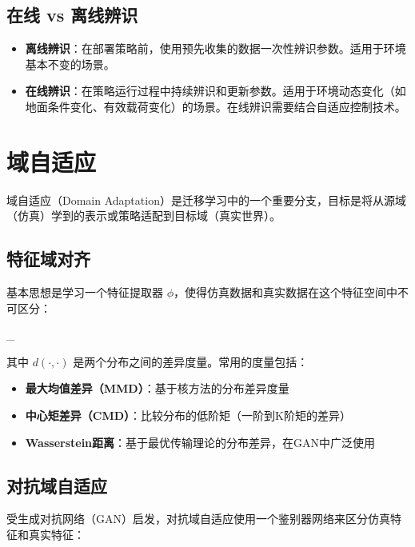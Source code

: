 \subsection{在线 vs 离线辨识}

\begin{itemize}
    \item \textbf{离线辨识}：在部署策略前，使用预先收集的数据一次性辨识参数。适用于环境基本不变的场景。
    \item \textbf{在线辨识}：在策略运行过程中持续辨识和更新参数。适用于环境动态变化（如地面条件变化、有效载荷变化）的场景。在线辨识需要结合自适应控制技术。
\end{itemize}

\section{域自适应}

域自适应（Domain Adaptation）是迁移学习中的一个重要分支，目标是将从源域（仿真）学到的表示或策略适配到目标域（真实世界）。

\subsection{特征域对齐}

基本思想是学习一个特征提取器 $\phi$，使得仿真数据和真实数据在这个特征空间中不可区分：

\begin{myformula}
\min_\phi {}
\end{myformula}

其中 $d(\cdot, \cdot)$ 是两个分布之间的差异度量。常用的度量包括：

\begin{itemize}
    \item \textbf{最大均值差异（MMD）}：基于核方法的分布差异度量
    \item \textbf{中心矩差异（CMD）}：比较分布的低阶矩（一阶到K阶矩的差异）
    \item \textbf{Wasserstein距离}：基于最优传输理论的分布差异，在GAN中广泛使用
\end{itemize}

\subsection{对抗域自适应}

受生成对抗网络（GAN）启发，对抗域自适应使用一个鉴别器网络来区分仿真特征和真实特征：

